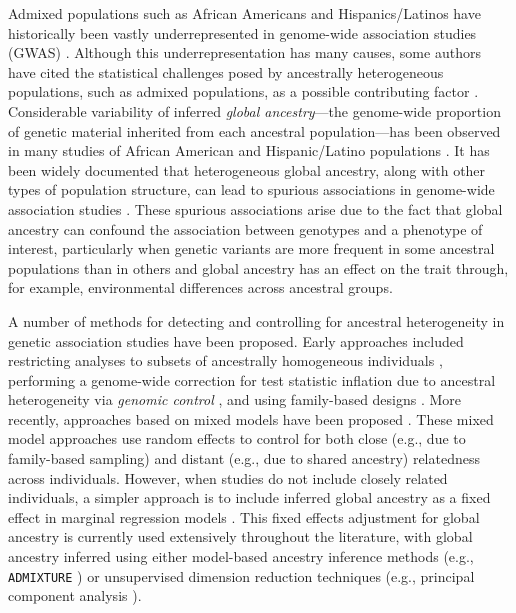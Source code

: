 \documentclass[12pt]{article}
\newcommand{\add}[1]{{\color{red}{[... #1 ...]}}}
\begin{document}
Admixed populations such as African Americans and Hispanics/Latinos have historically been vastly underrepresented in genome-wide association studies (GWAS) \cite{need2009, bustamante2011, popejoy2016, morales2018, sirugo2019, martin2019}. 
Although this underrepresentation has many causes, some authors have cited the statistical challenges posed by ancestrally heterogeneous populations, such as admixed populations, as a possible contributing factor \citep{need2009, bustamante2011, popejoy2016}.  \add{Manolio 2019 ``Using the data we have" and Hindorff 2018 ``Prioritizing diversity in human genomics research"}
Considerable variability of inferred \textit{global ancestry}---the genome-wide proportion of genetic material inherited from each ancestral population---has been observed in many studies of African American and Hispanic/Latino populations \citep{parra1998, tishkoff2009, bryc2010aa, bryc2010hl, conomos2016}.
It has been widely documented that heterogeneous global ancestry, along with other types of population structure, can lead to spurious associations in genome-wide association studies \citep{GenomicControl, eigenstrat, marchini2004, price2010}. 
These spurious associations arise due to the fact that global ancestry can confound the association between genotypes and a phenotype of interest, particularly when genetic variants are more frequent in some ancestral populations than in others  and global ancestry has an effect on the trait through, for example, environmental differences across ancestral groups. 

A number of methods for detecting and controlling for ancestral heterogeneity in genetic association studies have been proposed. 
Early approaches included restricting analyses to subsets of ancestrally homogeneous individuals \citep{lander1994}, performing a genome-wide correction for test statistic inflation due to ancestral heterogeneity via \textit{genomic control} \citep{GenomicControl}, and using family-based designs \citep{tdt}. 
More recently, approaches based on mixed models have been proposed \citep{yu2006, kang2010, yang2014}. 
These mixed model approaches use random effects to control for both close (e.g., due to family-based sampling) and distant (e.g., due to shared ancestry) relatedness across individuals.
However, when studies do not include closely related individuals, a simpler approach is to include inferred global ancestry as a fixed effect in marginal regression models \citep{eigenstrat, pritchard2000}. 
This fixed effects adjustment for global ancestry is currently used extensively throughout the literature, with global ancestry inferred using either model-based ancestry inference methods (e.g., \texttt{ADMIXTURE} \citep{admixture}) or unsupervised dimension reduction techniques (e.g., principal component analysis \citep{eigenstrat}).
\end{document}
